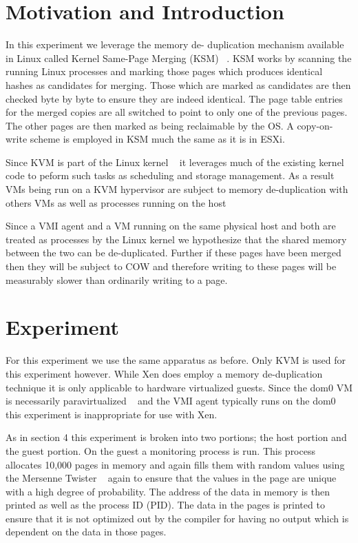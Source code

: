 \label{PageMergeChap}

\section{Motivation and Introduction}\label{PageMergeChap-intro}
In this experiment we leverage the memory de- duplication mechanism available in Linux called Kernel Same-Page Merging (KSM) ~\cite{arcangeli_increasing_2009}. KSM works by scanning the running Linux processes and marking those pages which produces identical hashes as candidates for merging. Those which are marked as candidates are then checked byte by byte to ensure they are indeed identical. The page table entries for the merged copies are all switched to point to only one of the previous pages. The other pages are then marked as being reclaimable by the OS. A copy-on-write scheme is employed in KSM much the same as it is in ESXi.

Since KVM is part of the Linux kernel ~\cite{_Linux_archive} it leverages much of the existing kernel code to peform such tasks as scheduling and storage management. As a result VMs being run on a KVM hypervisor are subject to memory de-duplication with others VMs as well as processes running on the host

Since a VMI agent and a VM running on the same physical host and both are treated as processes by the Linux kernel we hypothesize that the shared memory between the two can be de-duplicated. Further if these pages have been merged then they will be subject to COW and therefore writing to these pages will be measurably slower than ordinarily writing to a page.

\section{Experiment}\label{PageMergeChap-Exp}
For this experiment we use the same apparatus as before. Only KVM is used for this experiment however. While Xen does employ a memory de-duplication technique it is only applicable to hardware virtualized guests. Since the dom0 VM is necessarily paravirtualized ~\cite{barham_xen_2003} and the VMI agent typically runs on the dom0 this experiment is inappropriate for use with Xen. 

As in section 4 this experiment is broken into two portions; the host portion and the guest portion. On the guest a monitoring process is run. This process allocates 10,000 pages in memory and again fills them with random values using the Mersenne Twister ~\cite{matsumoto_mersenne_1998} again to ensure that the values in the page are unique with a high degree of probability. The address of the data in memory is then printed as well as the process ID (PID). The data in the pages is printed to ensure that it is not optimized out by the compiler for having no output which is dependent on the data in those pages.


